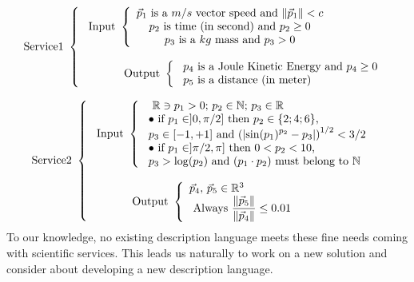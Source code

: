 \documentclass[a4paper,11pt] {ivoa}
\begin{document}
\begin{equation}\label{PDLExemplum01}
\mbox{Service1 }\left\{
\begin{array}{l}
\ \mbox{Input } \left\{
\begin{array}{c}
 \mbox{$\vec p_1$ is a $m/s$ vector speed and $\| \vec p_1\|<c$} \\
 \mbox{ $p_2$ is time (in second) and $p_2 \geq 0$ }\\
 \mbox{$p_3$ is a $kg$ mass and $p_3 > 0$}\\
\end{array}
\right. \\
\\
\ \mbox{\hspace{1cm} Output } \left\{
\begin{array}{l}
 \mbox{ $p_4$ is a Joule Kinetic Energy and $p_4 \geq 0$} \\
 \mbox{ $p_5$ is a distance (in meter) }\\
 \end{array}
\right.\\
\end{array}
\right.
\end{equation}

\begin{equation}\label{PDLExemplum02}
\mbox{Service2 } \left\{
\begin{array}{l}
\ \mbox{Input } \left\{
\begin{array}{l}
\ \mbox{ $\mathbb R \ni p_1 >0$; $p_2 \in \mathbb N$; $p_3 \in \mathbb R$} \\
\  \bullet \mbox{ if $p_1 \in ]0,\pi/2]$ then $p_2 \in \{2;4;6\}$,}\\
\ \mbox{$p_3 \in [-1,+1]$ and $\displaystyle \left( \left|  \sin(p_1)^{p_2} -p_3 \right| \right)^{1/2}<3/2$ } \\
\ \bullet \mbox{ if $p_1 \in ]\pi/2,\pi]$ then $0<p_2 < 10$,}\\
\ \mbox{$p_3>\log(p_2)$ and $(p_1 \cdot p_2)$ must belong to $\mathbb N$} \\
\end{array}
\right. \\
\\
\ \mbox{\hspace{1cm} Output } \left\{
\begin{array}{l}
 \mbox{$\vec p_4, \, \vec p_5 \in \mathbb R^3$ } \\
 \ \mbox{Always $\displaystyle \frac{\| \vec p_5\|}{\|\vec p_4 \|} \leq 0.01 $} \\
 \end{array}
\right.\\
\end{array}
\right.
\end{equation}
To our knowledge, no existing description language meets these fine needs coming with scientific
services. This leads us naturally to work on a new solution and consider about developing a new
description language.\\
\end{document}
